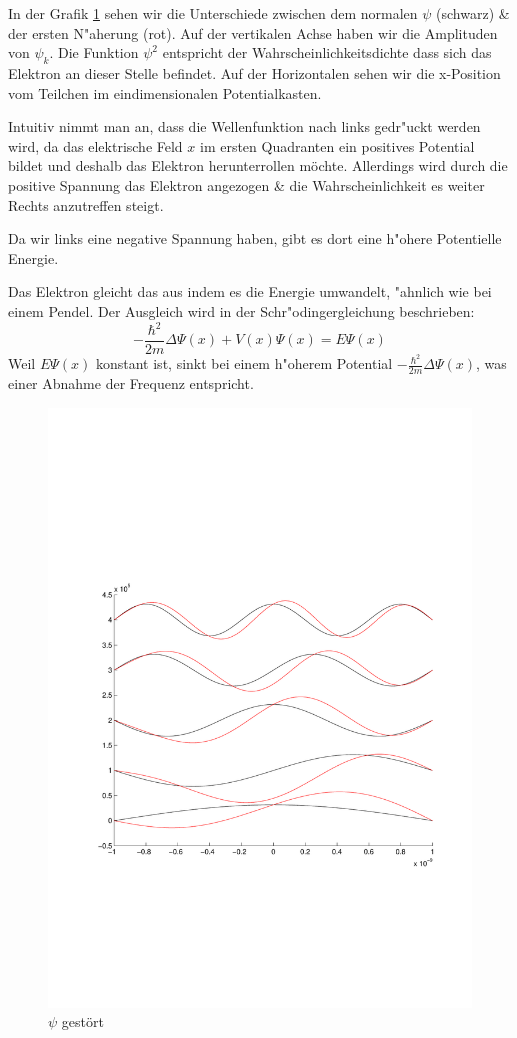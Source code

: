 \begin{refsection}
In der Grafik \ref{abb:efeld_psi_gestoert} sehen wir die Unterschiede zwischen dem normalen $\psi$ (schwarz) \& der ersten N"aherung (rot).
Auf der vertikalen Achse haben wir die Amplituden von $\psi_k$.
Die Funktion $\psi^2$ entspricht der Wahrscheinlichkeitsdichte dass sich das Elektron an dieser Stelle befindet.
Auf der Horizontalen sehen wir die x-Position vom Teilchen im eindimensionalen Potentialkasten.

Intuitiv nimmt man an, dass die Wellenfunktion nach links gedr"uckt werden wird, da das
elektrische Feld $x$ im ersten Quadranten ein positives Potential bildet
und deshalb das Elektron herunterrollen m\"ochte.
Allerdings wird durch die positive Spannung das Elektron angezogen \& die
Wahrscheinlichkeit es weiter Rechts anzutreffen steigt.

Da wir links eine negative Spannung haben, gibt es dort eine h"ohere Potentielle Energie.


Das Elektron gleicht das aus indem es die Energie umwandelt,
"ahnlich wie bei einem Pendel.
Der Ausgleich wird in der Schr"odingergleichung beschrieben:
\[
-\frac{\hbar^2}{2m}\Delta\Psi(x) + V(x)\Psi(x)
=
E \Psi(x)
\]
Weil $E \Psi(x)$ konstant ist, sinkt bei einem h"oherem Potential $-\frac{\hbar^2}{2m}\Delta\Psi(x)$,
was einer Abnahme der Frequenz entspricht.

\begin{figure}
 \centering
 \includegraphics[width=12cm,clip=true,trim=2cm 7cm 1cm 8cm]{efeld/Psi_gestoert.pdf}
 \caption{$\psi$ gest\"ort}
 \label{abb:efeld_psi_gestoert}
\end{figure}




\end{refsection}
